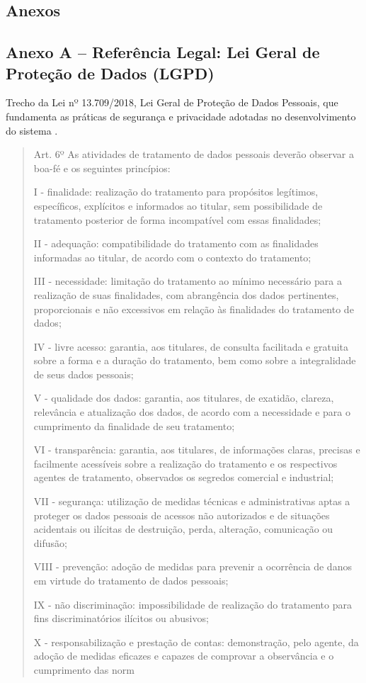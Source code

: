 \begin{anexosenv}

\chapter*{Anexos}

\section{Anexo A – Referência Legal: Lei Geral de Proteção de Dados (LGPD)}
Trecho da Lei nº 13.709/2018, Lei Geral de Proteção de Dados Pessoais, que fundamenta as práticas de segurança e privacidade adotadas no desenvolvimento do sistema \cite{lgpd2018}.

\begin{quote}
Art. 6º As atividades de tratamento de dados pessoais deverão observar a boa-fé e os seguintes princípios:

I - finalidade: realização do tratamento para propósitos legítimos, específicos, explícitos e informados ao titular, sem possibilidade de tratamento posterior de forma incompatível com essas finalidades;

II - adequação: compatibilidade do tratamento com as finalidades informadas ao titular, de acordo com o contexto do tratamento;

III - necessidade: limitação do tratamento ao mínimo necessário para a realização de suas finalidades, com abrangência dos dados pertinentes, proporcionais e não excessivos em relação às finalidades do tratamento de dados;

IV - livre acesso: garantia, aos titulares, de consulta facilitada e gratuita sobre a forma e a duração do tratamento, bem como sobre a integralidade de seus dados pessoais;

V - qualidade dos dados: garantia, aos titulares, de exatidão, clareza, relevância e atualização dos dados, de acordo com a necessidade e para o cumprimento da finalidade de seu tratamento;

VI - transparência: garantia, aos titulares, de informações claras, precisas e facilmente acessíveis sobre a realização do tratamento e os respectivos agentes de tratamento, observados os segredos comercial e industrial;

VII - segurança: utilização de medidas técnicas e administrativas aptas a proteger os dados pessoais de acessos não autorizados e de situações acidentais ou ilícitas de destruição, perda, alteração, comunicação ou difusão;

VIII - prevenção: adoção de medidas para prevenir a ocorrência de danos em virtude do tratamento de dados pessoais;

IX - não discriminação: impossibilidade de realização do tratamento para fins discriminatórios ilícitos ou abusivos;

X - responsabilização e prestação de contas: demonstração, pelo agente, da adoção de medidas eficazes e capazes de comprovar a observância e o cumprimento das norm
\end{quote}

\end{anexosenv}